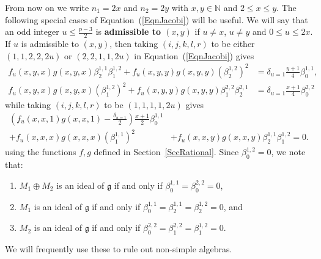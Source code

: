 \documentclass[11pt,a4paper,reqno]{amsart}
\theoremstyle{definition}
\numberwithin{equation}{section}
\newcommand{\mN}{\mathbb{N}}
\newcommand{\fg}{\mathfrak{g}}
\begin{document}
From now on we write $n_1=2x$ and $n_2=2y$ with $x,y\in\mN$ and $2\leq x\leq y$. The following special cases of Equation~(\ref{EqnJacobi}) will be useful. We will say that an odd integer $u\leq\frac{p-3}2$ is \textbf{admissible to $(x,y)$} if $u\neq x$, $u\neq y$ and $0\leq u\leq 2x$. If $u$ is admissible to $(x,y)$, then taking $(i,j,k,l,r)$ to be either $(1,1,2,2,2u)$ or $(2,2,1,1,2u)$ in Equation~(\ref{EqnJacobi}) gives
\begin{equation}\label{EqnJacobiCut}
\begin{split}
f_u(x,y,x)g(x,y,x)\beta^{1,1}_2\beta^{1,2}_1+f_u(x,y,y)g(x,y,y)(\beta^{1,2}_2)^2&=\delta_{u=1}\frac{y+1}4\beta^{1,1}_0,\\
f_u(x,y,x)g(x,y,x)(\beta^{1,2}_1)^2+f_u(x,y,y)g(x,y,y)\beta^{2,2}_1\beta^{2,1}_2&=\delta_{u=1}\frac{x+1}4\beta^{2,2}_0
\end{split}
\end{equation}
while taking $(i,j,k,l,r)$ to be $(1,1,1,1,2u)$ gives
\begin{equation}\label{Eqn1111}
\begin{split}\left(f_u(x,x,1)g(x,x,1)-\frac{\delta_{u=1}}2\right)\frac{x+1}2\beta^{1,1}_0&\\
+f_u(x,x,x)g(x,x,x)(\beta^{1,1}_1)^2&+f_u(x,x,y)g(x,x,y)\beta^{1,1}_2\beta^{1,2}_1=0.\end{split}
\end{equation}
using the functions $f,g$ defined in Section~\ref{SecRational}. Since $\beta^{1,2}_0=0$, we note that:
\begin{enumerate}
\item $M_1\oplus M_2$ is an ideal of $\fg$ if and only if $\beta^{1,1}_0=\beta^{2,2}_0=0$,
\item $M_1$ is an ideal of $\fg$ if and only if $\beta^{1,1}_0=\beta^{1,1}_2=\beta^{1,2}_2=0$, and
\item $M_2$ is an ideal of $\fg$ if and only if $\beta^{2,2}_0=\beta^{2,2}_1=\beta^{1,2}_1=0$.
\end{enumerate}
We will frequently use these to rule out non-simple algebras.
\end{document}

